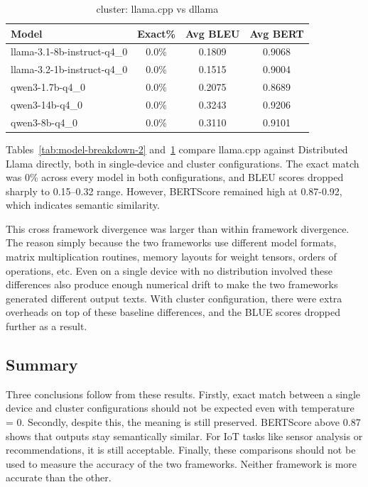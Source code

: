 \begin{table}[htbp]
\centering
\caption{cluster: llama.cpp vs dllama}
\label{tab:model-breakdown-4}
\begin{tabular}{lccc}
\hline
\textbf{Model} & \textbf{Exact\%} & \textbf{Avg BLEU} & \textbf{Avg BERT} \\ 
\hline
llama-3.1-8b-instruct-q4\_0 & 0.0\% & 0.1809 & 0.9068 \\
llama-3.2-1b-instruct-q4\_0 & 0.0\% & 0.1515 & 0.9004 \\
qwen3-1.7b-q4\_0            & 0.0\% & 0.2075 & 0.8689 \\
qwen3-14b-q4\_0             & 0.0\% & 0.3243 & 0.9206 \\
qwen3-8b-q4\_0              & 0.0\% & 0.3110 & 0.9101 \\ 
\hline
\end{tabular}
\end{table}

Tables~\ref{tab:model-breakdown-2} and~\ref{tab:model-breakdown-4} compare llama.cpp
against Distributed Llama directly, both in single-device and cluster configurations. The exact match was 0\% across every model in both configurations, and BLEU scores dropped sharply to 0.15--0.32 range. However, BERTScore remained high at 0.87-0.92, which indicates semantic similarity. 

This cross framework divergence was larger than within framework divergence. The reason simply because the two frameworks use different model formats, matrix multiplication routines, memory layouts for weight tensors, orders of operations, etc. Even on a single device with no distribution involved these differences also produce enough numerical drift to make the two frameworks generated different output texts. With cluster configuration, there were extra overheads on top of these baseline differences, and the BLUE scores dropped further as a result.

\subsection{Summary}
Three conclusions follow from these results. Firstly, exact match between a single device and cluster configurations should not be expected even with temperature = 0. Secondly, despite this, the meaning is still preserved. BERTScore above 0.87 shows that outputs stay semantically similar. For IoT tasks like sensor analysis or recommendations, it is still acceptable. Finally, these comparisons should not be used to measure the accuracy of the two frameworks. Neither framework is more accurate than the other.